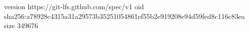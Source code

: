version https://git-lfs.github.com/spec/v1
oid sha256:a78928c4315a31a29573b35251054861ef55b2e919208e94d59fed8c116c83ea
size 349676
